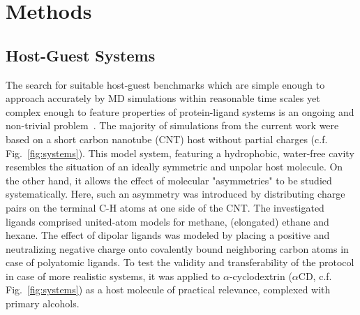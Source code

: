 \documentclass[9pt,lessons,pubversion]{livecoms}
\begin{document}
\section{Methods}

\subsection{Host-Guest Systems}

The search for suitable host-guest benchmarks which are simple enough to approach accurately by MD simulations within reasonable time scales 
yet complex enough to feature properties of protein-ligand systems is an ongoing and non-trivial problem~\cite{mobley2017predicting, weiss2018affinity}.
The majority of simulations from the current work were based on a short carbon nanotube (CNT) host without partial charges (c.f. Fig.~\ref{fig:systems}).
This model system, featuring a hydrophobic, water-free cavity resembles the situation of an ideally symmetric and unpolar host molecule. 
On the other hand, it allows the effect of molecular "asymmetries" to be studied systematically.
Here, such an asymmetry was introduced by distributing charge pairs on the terminal C-H atoms at one side of the CNT.
The investigated ligands comprised united-atom models for methane, (elongated) ethane and hexane.
The effect of dipolar ligands was modeled by placing a positive and neutralizing negative charge onto covalently bound neighboring carbon atoms in case of polyatomic ligands.
To test the validity and transferability of the protocol in case of more realistic systems, it was applied to $\alpha$-cyclodextrin ($\alpha$CD, c.f. Fig.~\ref{fig:systems}) as a host molecule of practical relevance, complexed with primary alcohols.
\end{document}
